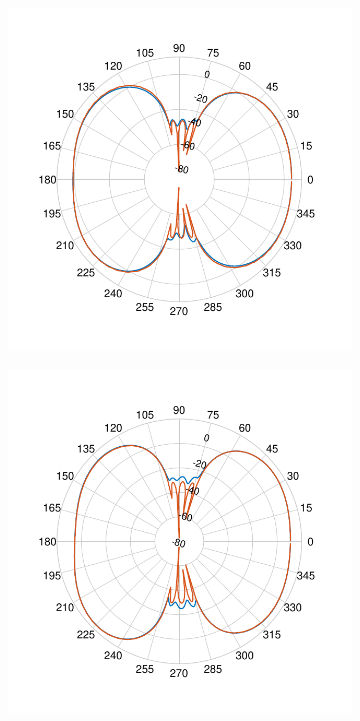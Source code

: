 \documentclass[12pt,a4paper,twocolumn]{article}
\begin{document}
{\begin{figure}
\begin{center}
		\begin{subfigure}{0.25\linewidth}
	\includegraphics[scale=0.5]{pcb_pifa_array_azimuth_45_comparison.pdf}
	\caption{}
\end{subfigure}
\begin{subfigure}{0.25\linewidth}
	\includegraphics[scale=0.5]{pcb_pifa_array_elevation_45_comparison.pdf}

\end{subfigure}
\end{center}
\end{figure}}
\end{document}
